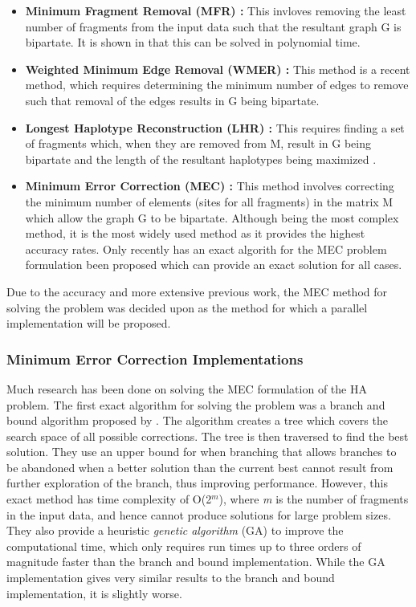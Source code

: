 \documentclass[10pt,twocolumn]{witseiepaper}
\newcommand{\M}{\textit{m }}
\begin{document}
\begin{itemize}
    \item{ \textbf{Minimum Fragment Removal (MFR) :} This invloves removing the least number of fragments 
            from the input data such that the resultant graph G is bipartate. It is shown in 
            \cite{lancia:2001} that this can be solved in polynomial time.
        }
\item{ \textbf{Weighted Minimum Edge Removal (WMER) \cite{aguiar:2012} :} This method is a recent method,
        which requires determining the minimum number of edges to remove such that removal of the edges
        results in G being bipartate.
    }
\item{ \textbf{Longest Haplotype Reconstruction (LHR) :} This requires finding a set of fragments which,
        when they are removed from M, result in G being bipartate and the length of the resultant 
        haplotypes being maximized \cite{schwartz:2010}. 
    }
\item{ \textbf{Minimum Error Correction (MEC) :} This method involves correcting the minimum number of 
        elements (sites for all fragments) in the matrix M which allow the graph G to be bipartate. 
        Although being the most complex method, it is the most widely used method as it provides the 
        highest accuracy rates. Only recently has an exact algorith for the MEC problem formulation been
        proposed which can provide an exact solution for all cases.
    }
\end{itemize}

Due to the accuracy and more extensive previous work, the MEC method for solving the problem was decided upon
as the method for which a parallel implementation will be proposed.

\subsubsection{ Minimum Error Correction Implementations } \label{sec:mecimp}

Much research has been done on solving the MEC formulation of the HA problem. The first exact algorithm for
solving the problem was a branch and bound algorithm proposed by \cite{wang:2005}. The algorithm creates a
tree which covers the search space of all possible corrections. The tree is then traversed to find the best
solution. They use an upper bound for when branching that allows branches to be abandoned when a better
solution than the current best cannot result from further exploration of the branch, thus improving
performance. However, this exact method has time complexity of O(2$^{\textit{m}}$), where \M is the
number of fragments in the input data, and hence cannot produce solutions for large problem sizes. They also 
provide a heuristic \textit{genetic algorithm} (GA) to improve the computational time, which only requires 
run times up to three orders of magnitude faster than the branch and bound implementation. While the GA
implementation gives very similar results to the branch and bound implementation, it is slightly worse. 
\end{document}
